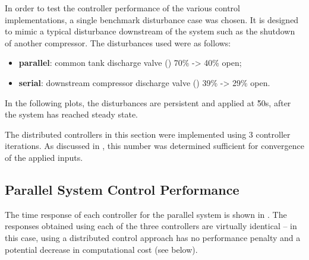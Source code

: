 In order to test the controller performance of the various control implementations, a single benchmark disturbance case was chosen.
It is designed to mimic a typical disturbance downstream of the system such as the shutdown of another compressor.
The disturbances used were as follows:

\begin{itemize}
  \item \textbf{parallel}: common tank discharge valve () 70\% -> 40\% open;
  \item \textbf{serial}: downstream compressor discharge valve () 39\% -> 29\% open.
\end{itemize}
In the following plots, the disturbances are persistent and applied at \u{50}{s}, after the system has reached steady state.

The distributed controllers in this section were implemented using 3 controller iterations. 
As discussed in \cite{Jones2016}, this number was determined sufficient for convergence of the applied inputs.

\subsection{Parallel System Control Performance}
The time response of each controller for the parallel system is shown in .
The responses obtained using each of the three controllers are virtually identical -- in this case, using a distributed control approach has no performance penalty and a potential decrease in computational cost (see below).




